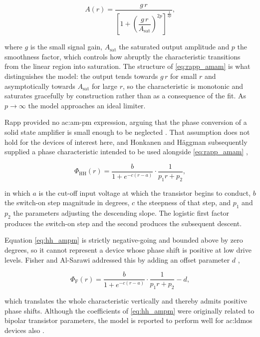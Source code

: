 \begin{equation}
  A(r) = \frac{g\,r}{\left[1 + \left(\dfrac{g\,r}{A_{\text{sat}}}\right)^{2p}\right]^{\frac{1}{2p}}},
  \label{eq:rapp_amam}
\end{equation}

where $g$ is the small signal gain, $A_{\text{sat}}$ the saturated output amplitude and $p$ the smoothness factor, which controls how abruptly the characteristic transitions from the linear region into saturation. The structure of \eqref{eq:rapp_amam} is what distinguishes the model: the output tends towards $g\,r$ for small $r$ and asymptotically towards $A_{\text{sat}}$ for large $r$, so the characteristic is monotonic and saturates gracefully by construction rather than as a consequence of the fit. As $p \rightarrow \infty$ the model approaches an ideal limiter.

Rapp provided no \gls{ac:am-pm} expression, arguing that the phase conversion of a solid state amplifier is small enough to be neglected \cite{rapp}. That assumption does not hold for the devices of interest here, and Honkanen and H\"aggman subsequently supplied a phase characteristic intended to be used alongside \eqref{eq:rapp_amam} \cite{honkanen},

\begin{equation}
  \Phi_{\text{HH}}(r) = \frac{b}{1 + e^{-c(r-a)}} \cdot \frac{1}{p_1 r + p_2},
  \label{eq:hh_ampm}
\end{equation}

in which $a$ is the cut-off input voltage at which the transistor begins to conduct, $b$ the switch-on step magnitude in degrees, $c$ the steepness of that step, and $p_1$ and $p_2$ the parameters adjusting the descending slope. The logistic first factor produces the switch-on step and the second produces the subsequent descent.

Equation \eqref{eq:hh_ampm} is strictly negative-going and bounded above by zero degrees, so it cannot represent a device whose phase shift is positive at low drive levels. Fisher and Al-Sarawi addressed this by adding an offset parameter $d$ \cite{fisher},

\begin{equation}
  \Phi_{\text{F}}(r) = \frac{b}{1 + e^{-c(r-a)}} \cdot \frac{1}{p_1 r + p_2} - d,
  \label{eq:fisher_ampm}
\end{equation}

which translates the whole characteristic vertically and thereby admits positive phase shifts. Although the coefficients of \eqref{eq:hh_ampm} were originally related to bipolar transistor parameters, the model is reported to perform well for \gls{ac:ldmos} devices also \cite{fisher}.

